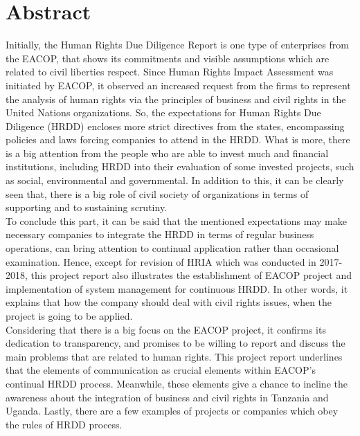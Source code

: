\documentclass[12pt]{article}
\begin{document}
\section{Abstract}
{\fontsize{12pt}{12pt}\selectfont



\hspace*{1em} Initially, the Human Rights Due Diligence Report is one type of enterprises from the EACOP, that shows its commitments and visible assumptions which are related to civil liberties respect. Since Human Rights Impact Assessment was initiated by EACOP, it observed an increased request from the firms to represent the analysis of human rights via the principles of business and civil rights in the United Nations organizations. So, the expectations for Human Rights Due Diligence (HRDD) encloses more strict directives from the states, encompassing policies and laws forcing companies to attend in the HRDD. What is more, there is a big attention from the people who are able to invest much and financial institutions, including HRDD into their evaluation of some invested projects, such as social, environmental and governmental. In addition to this, it can be clearly seen that, there is a big role of civil society of organizations in terms of supporting and to sustaining scrutiny. 
\\

To conclude this part, it can be said that the mentioned expectations may make necessary companies to integrate the HRDD in terms of regular business operations, can bring attention to continual application rather than occasional examination. Hence, except for revision of HRIA which was conducted in 2017-2018, this project report also illustrates the establishment of EACOP project and implementation of system management for continuous HRDD. In other words, it explains that how the company should deal with civil rights issues, when the project is going to be applied.  
\\

Considering that there is a big focus on the EACOP project, it confirms its dedication to transparency, and promises to be willing to report and discuss the main problems that are related to human rights. This project report underlines that the elements of communication as crucial elements within EACOP’s continual HRDD process. Meanwhile, these elements give a chance to incline the awareness about the integration of business and civil rights in Tanzania and Uganda. Lastly, there are a few examples of projects or companies which obey the rules of HRDD process.
\\
\\

}
\end{document}

